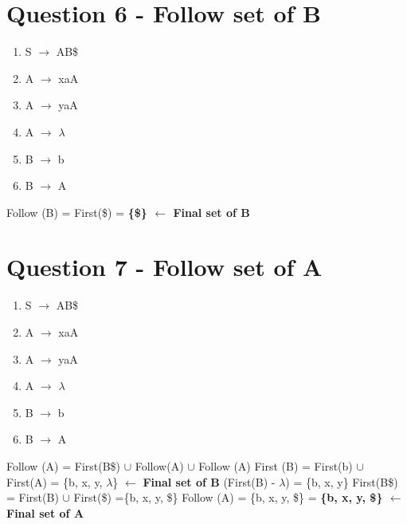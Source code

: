 \documentclass{article}
\begin{document}
\newpage
\section*{Question 6 - Follow set of B}
\vspace{-1.5em}
\begin{multicols}{2}
  \begin{enumerate}
    \setlength\itemsep{-.25em}
    \item S $\rightarrow$ AB\$
    \item A $\rightarrow$ xaA
    \item A $\rightarrow$ yaA
    \item A $\rightarrow$ $\lambda$
    \item B $\rightarrow$ b
    \item B $\rightarrow$ A
  \end{enumerate}
\setlength{\leftskip}{-12em}
Follow (B) = First(\$) = \textbf{\{\$\}  $\leftarrow$ Final set of B}
\newline\newline\newline\newline
\end{multicols}

\section*{Question 7 - Follow set of A}
\vspace{-1.5em}
\begin{multicols}{2}
  \begin{enumerate}
    \setlength\itemsep{-.25em}
    \item S $\rightarrow$ AB\$
    \item A $\rightarrow$ xaA
    \item A $\rightarrow$ yaA
    \item A $\rightarrow$ $\lambda$
    \item B $\rightarrow$ b
    \item B $\rightarrow$ A
  \end{enumerate}
\setlength{\leftskip}{-12em}
Follow (A) = First(B\$) $\cup$ Follow(A) $\cup$ Follow (A)\newline
First (B) = First(b) $\cup$  First(A) = \{b, x, y, $\lambda$\}  $\leftarrow$ \textbf{Final set of B}\newline
\indent\hspace{.25cm}(First(B) - $\lambda$) = \{b, x, y\}\newline
\indent\hspace{.25cm}First(B\$) = First(B) $\cup$ First(\$) =\{b, x, y, \$\}\newline
Follow (A) = \{b, x, y, \$\} = \textbf{\{b, x, y, \$\} $\leftarrow$ Final set of A}\newline
\newline
\end{multicols}
\end{document}
